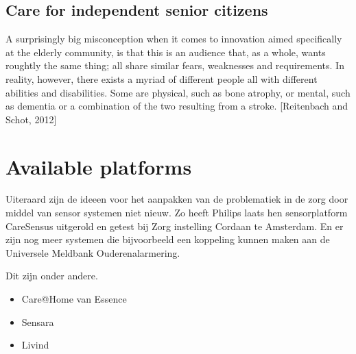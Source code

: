 \documentclass{below-ext}
\begin{document}
\subsection{Care for independent senior citizens}

A surprisingly big misconception when it comes to innovation aimed specifically at the elderly community, is that this is an audience that, as a whole, wants roughtly the same thing; all share similar fears, weaknesses and requirements. In reality, however, there exists a myriad of different people all with different abilities and disabilities. Some are physical, such as bone atrophy, or mental, such as dementia or a combination of the two resulting from a stroke. [Reitenbach and Schot, 2012]

\section{Available platforms}
Uiteraard zijn de ideeen voor het aanpakken van de problematiek in de zorg door middel van sensor systemen niet nieuw. Zo heeft Philips laats hen sensorplatform CareSensus uitgerold en getest bij Zorg instelling Cordaan te Amsterdam.
En er zijn nog meer systemen die bijvoorbeeld een koppeling kunnen maken aan de Universele Meldbank Ouderenalarmering.

Dit zijn onder andere.
\begin{itemize}
\item Care@Home van Essence
\item Sensara
\item Livind
\end{itemize}


\end{document}
